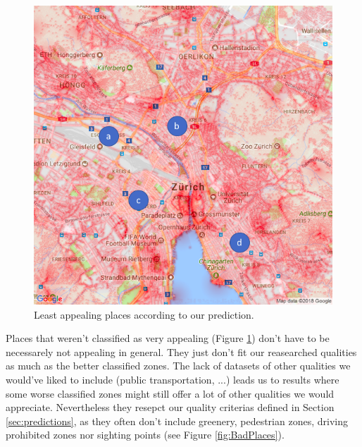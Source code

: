 \documentclass[letterpaper]{article}
\begin{document}
\begin{figure}[H]
    \centering
     \includegraphics[width=.9\linewidth]{images/bad/combined_labeled.png}
    \caption{Least appealing places according to our prediction.}
    \label{fig:BadPlacesLegend}
\end{figure}

Places that weren't classified as very appealing (Figure \ref{fig:BadPlacesLegend}) don't have to be necessarely not appealing in general. They just don't fit
our reasearched qualities as much as the better classified zones. The lack of datasets of other qualities we would've
liked to include (public transportation, ...) leads us to results where some worse classified zones might still
offer a lot of other qualities we would appreciate. Nevertheless they resepct our quality criterias defined in Section \ref{sec:predictions}, as they
often don't include greenery, pedestrian zones, driving prohibited zones nor sighting points (see Figure \ref{fig:BadPlaces}).
\end{document}
